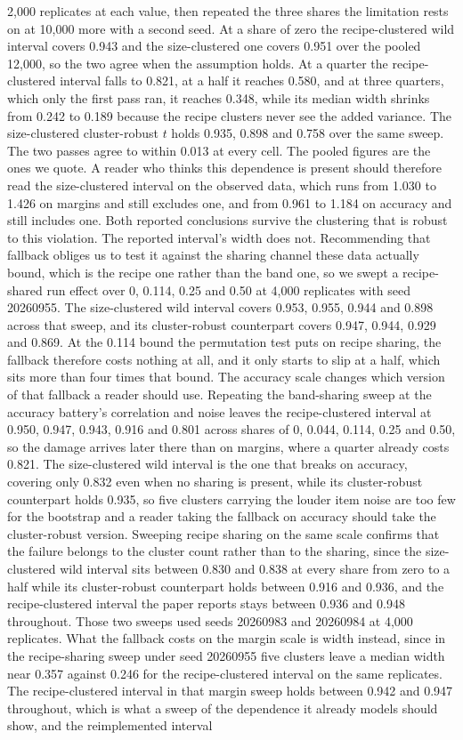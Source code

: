 2,000 replicates at each value, then repeated the three shares the limitation rests on at 10,000 more with a second seed. At a share of zero the recipe-clustered wild interval covers 0.943 and the size-clustered one covers 0.951 over the pooled 12,000, so the two agree when the assumption holds. At a quarter the recipe-clustered interval falls to 0.821, at a half it reaches 0.580, and at three quarters, which only the first pass ran, it reaches 0.348, while its median width shrinks from 0.242 to 0.189 because the recipe clusters never see the added variance. The size-clustered cluster-robust $t$ holds 0.935, 0.898 and 0.758 over the same sweep. The two passes agree to within 0.013 at every cell. The pooled figures are the ones we quote. A reader who thinks this dependence is present should therefore read the size-clustered interval on the observed data, which runs from 1.030 to 1.426 on margins and still excludes one, and from 0.961 to 1.184 on accuracy and still includes one. Both reported conclusions survive the clustering that is robust to this violation. The reported interval's width does not. Recommending that fallback obliges us to test it against the sharing channel these data actually bound, which is the recipe one rather than the band one, so we swept a recipe-shared run effect over 0, 0.114, 0.25 and 0.50 at 4,000 replicates with seed 20260955. The size-clustered wild interval covers 0.953, 0.955, 0.944 and 0.898 across that sweep, and its cluster-robust counterpart covers 0.947, 0.944, 0.929 and 0.869. At the 0.114 bound the permutation test puts on recipe sharing, the fallback therefore costs nothing at all, and it only starts to slip at a half, which sits more than four times that bound. The accuracy scale changes which version of that fallback a reader should use. Repeating the band-sharing sweep at the accuracy battery's correlation and noise leaves the recipe-clustered interval at 0.950, 0.947, 0.943, 0.916 and 0.801 across shares of 0, 0.044, 0.114, 0.25 and 0.50, so the damage arrives later there than on margins, where a quarter already costs 0.821. The size-clustered wild interval is the one that breaks on accuracy, covering only 0.832 even when no sharing is present, while its cluster-robust counterpart holds 0.935, so five clusters carrying the louder item noise are too few for the bootstrap and a reader taking the fallback on accuracy should take the cluster-robust version. Sweeping recipe sharing on the same scale confirms that the failure belongs to the cluster count rather than to the sharing, since the size-clustered wild interval sits between 0.830 and 0.838 at every share from zero to a half while its cluster-robust counterpart holds between 0.916 and 0.936, and the recipe-clustered interval the paper reports stays between 0.936 and 0.948 throughout. Those two sweeps used seeds 20260983 and 20260984 at 4,000 replicates. What the fallback costs on the margin scale is width instead, since in the recipe-sharing sweep under seed 20260955 five clusters leave a median width near 0.357 against 0.246 for the recipe-clustered interval on the same replicates. The recipe-clustered interval in that margin sweep holds between 0.942 and 0.947 throughout, which is what a sweep of the dependence it already models should show, and the reimplemented interval 